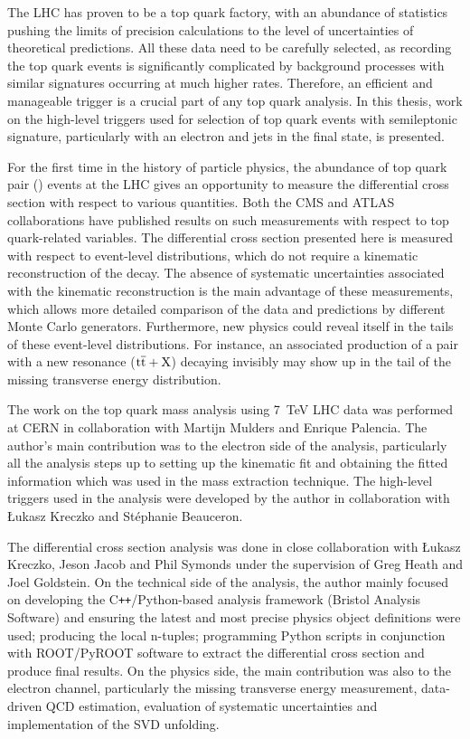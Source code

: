 The LHC has proven to be a top quark factory, with an abundance of statistics pushing the limits of precision
calculations to the level of uncertainties of theoretical predictions. All these data need to be carefully selected, as
recording the top quark events is significantly complicated by background processes with similar signatures occurring at
much higher rates. Therefore, an efficient and manageable trigger is a crucial part of any top quark analysis. In this
thesis, work on the high-level triggers used for selection of top quark events with semileptonic signature, particularly
with an electron and jets in the final state, is presented.

For the first time in the history of particle physics, the abundance of top quark pair (\ttbar) events at the LHC gives
an opportunity to measure the \ttbar differential cross section with respect to various quantities. Both the CMS and
ATLAS collaborations have published results on such measurements with respect to top quark-related variables. The \ttbar
differential cross section presented here is measured with respect to event-level distributions, which do not require a
kinematic reconstruction of the \ttbar decay. The absence of systematic uncertainties associated with the kinematic
reconstruction is the main advantage of these measurements, which allows more detailed comparison of the data and
predictions by different Monte Carlo generators. Furthermore, new physics could reveal itself in the tails of these
event-level distributions. For instance, an associated production of a \ttbar pair with a new resonance
($\mathrm{t}\overline{\mathrm{t}}+\mathrm{X}$) decaying invisibly may show up in the tail of the missing transverse energy distribution.

The work on the top quark mass analysis using \SI{7}{\TeV} LHC data was performed at CERN in collaboration with Martijn
Mulders and Enrique Palencia. The author's main contribution was to the electron side of the analysis, particularly all
the analysis steps up to setting up the kinematic fit and obtaining the fitted information which was used in the mass
extraction technique. The high-level triggers used in the analysis were developed by the author in collaboration with
\L{}ukasz Kreczko and St\'{e}phanie Beauceron.

The differential cross section analysis was done in close collaboration with \L{}ukasz Kreczko, Jeson Jacob and Phil
Symonds under the supervision of Greg Heath and Joel Goldstein. On the technical side of the analysis, the author mainly
focused on developing the C\texttt{++}/Python-based analysis framework (Bristol Analysis Software) and ensuring the
latest and most precise physics object definitions were used; producing the local n-tuples; programming Python scripts
in conjunction with ROOT/PyROOT software to extract the differential cross section and produce final results. On the
physics side, the main contribution was also to the electron channel, particularly the missing transverse energy
measurement, data-driven QCD estimation, evaluation of systematic uncertainties and implementation of the SVD unfolding.

